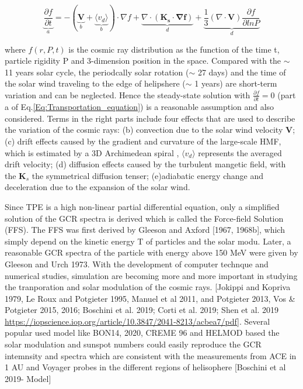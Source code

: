 	\begin{equation}
		\underbrace{\frac{\partial f}{\partial t}}_{a} = - ( \underbrace{\boldsymbol{V}}_{b} + \underbrace{\langle v_d \rangle }_{b}) \cdot \nabla f + \underbrace{\nabla \cdot (\boldsymbol{K_s \cdot \nabla f})}_{d} + \underbrace{\frac{1}{3}(\nabla \cdot \boldsymbol{V}) \frac{\partial f}{\partial ln P}}_{d}
		\label{Eq:Transportation_equation}
	\end{equation}

where $f(r, P, t)$ is the cosmic ray distribution as the function of the time t, particle rigidity P and 3-dimension position in the space. Compared with the $\sim$ 11 years solar cycle, the periodcally solar rotation ($\sim$ 27 days) and  the time of the solar wind traveling to the edge of helipshere ($\sim$ 1 years) are short-term variation and can be neglected. Hence the steady-state solution with  $\frac{\partial f}{\partial t} = 0$ (part a of Eq.\ref{Eq:Transportation_equation}) is a reasonable assumption and also considered. Terms in the right parts include four effects that are used to describe the variation of the cosmic rays: (b) convection due to the solar wind velocity $\boldsymbol{V}$; (c) drift effects caused by the gradient and curvature of the large-scale \ac{HMF}, which is estimated by a 3D Archimedean spiral \citet{Parker-1958}, $\langle v_d \rangle$ represents the averaged drift velocity; (d) diffusion effects caused by the turbulent mangetic field, with the $\boldsymbol{K}_s$ the symmetrical diffusion tenser; (e)adiabatic energy change and deceleration due to the expansion of the solar wind. 

Since TPE is a high non-linear partial differential equation, only a simplified solution of the GCR spectra is derived which is called the Force-field Solution (FFS). The FFS was first derived by Gleeson and Axford [1967, 1968b], which simply depend on the kinetic energy T of particles and the solar modu. Later, a reasonable GCR spectra of the particle with energy above 150 MeV were given by Gleeson and Urch 1973.
With the development of computer technque and numerical studies, simulation are becoming more and more important in studying the tranporation and solar modulation of the cosmic rays. [Jokippi and Kopriva 1979, Le Roux and Potgieter 1995, Manuel et al 2011, and Potgieter 2013, Vos \& Potgieter 2015, 2016; Boschini et al. 2019;
Corti et al. 2019; Shen et al. 2019 \url{https://iopscience.iop.org/article/10.3847/2041-8213/acbea7/pdf}]. 
Several popular used model like BON14, 2020, CREME 96 and HELMOD based the solar modulation and sunspot numbers could easily reproduce the GCR intemnsity and spectra which are consistent with the measurements from \ac{ACE} in 1 AU and Voyager probes in the different regions of helisophere [Boschini et al 2019- Model]

